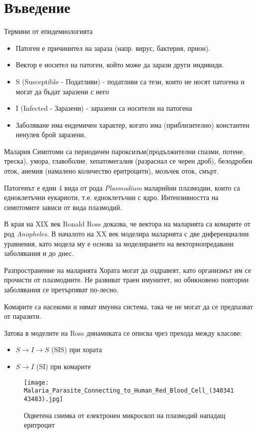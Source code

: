 \section{\hspace{1em}Въведение}

\begin{frame}[t]{Термини от епидемиологията}
  \begin{itemize}
    \item Патоген е причинител на зараза (напр. вирус, бактерия, прион).
    \item Вектор е носител на патоген, който може да зарази други индивиди.
    \item S (Susceptible - Податливи) - податливи са тези, които не носят патогена и могат да бъдат заразени с него
    \item I (Infected - Заразени) - заразени са носители на патогена
    \item Заболяване има ендемичен характер, когато има (приблизително) константен ненулев брой заразени.
  \end{itemize}
\end{frame}

\begin{frame}[t]{Малария}
  Симптоми са периодичен пароксизъм(продължителни спазми, потене, треска), умора, главоболие, хепатомегалия (разраснал се черен дроб), белодробен оток, анемия (намалено количество еритроцити), мозъчек оток, смърт.

  Патогенът е един 4 вида от рода \textit{Plasmodium} маларийни плазмодии, които са едноклетъчни еукариоти, т.е. едноклетъчни с ядро. Интензивността на симптомите зависи от вида плазмодий.

  В края на XIX век Ronald Ross доказва, че вектора на маларията са комарите от род \textit{Anopheles}.
  В началото на XX век моделира маларията с две диференциални уравнения, като модела му е основа за моделирането на векторнопредавани заболявания и до днес.
\end{frame}

\begin{frame}[t]{Разпространение на маларията}
  Хората могат да оздравеят, като организмът им се прочисти от плазмодиите.
  Не развиват траен имунитет, но обикновено повторни заболявания се претърпяват по-лесно.

  Комарите са насекоми и нямат имунна система, така че не могат да се предпазват от паразити.

  Затова в моделите на Ross динамиката се описва чрез прехода между класове:
  \begin{itemize}
    \item $S \rightarrow I \rightarrow S$ (SIS) при хората
    \item $S \rightarrow I$ (SI) при комарите
  \end{itemize}

  \begin{figure}
    \texttt{[image: Malaria\_Parasite\_Connecting\_to\_Human\_Red\_Blood\_Cell\_(34034143483).jpg]}
    \centering
    \caption{Оцветена снимка от електронен микроскоп на плазмодий нападащ еритроцит}
  \end{figure}
\end{frame}

